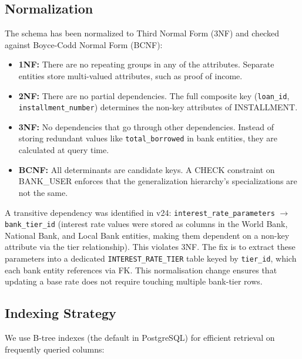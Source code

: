 \documentclass[12pt,a4paper]{report}
\begin{document}
\subsection{Normalization}

The schema has been normalized to Third Normal Form (3NF) and checked against Boyce-Codd Normal Form (BCNF):

\begin{itemize}[noitemsep]
\item \textbf{1NF:} There are no repeating groups in any of the attributes. Separate entities store multi-valued attributes, such as proof of income.
\item \textbf{2NF:} There are no partial dependencies. The full composite key (\texttt{loan\_id}, \texttt{installment\_number}) determines the non-key attributes of INSTALLMENT.
\item \textbf{3NF:} No dependencies that go through other dependencies. Instead of storing redundant values like \texttt{total\_borrowed} in bank entities, they are calculated at query time.
\item \textbf{BCNF:} All determinants are candidate keys. A CHECK constraint on BANK\_USER enforces that the generalization hierarchy's specializations are not the same.
\end{itemize}

\label{sec:normalization}
A transitive dependency was identified in v24: \texttt{interest\_rate\_parameters} $\to$ \texttt{bank\_tier\_id} (interest rate values were stored as columns in the World Bank, National Bank, and Local Bank entities, making them dependent on a non-key attribute via the tier relationship). This violates 3NF. The fix is to extract these parameters into a dedicated \texttt{INTEREST\_RATE\_TIER} table keyed by \texttt{tier\_id}, which each bank entity references via FK. This normalisation change ensures that updating a base rate does not require touching multiple bank-tier rows.

\subsection{Indexing Strategy}

We use B-tree indexes (the default in PostgreSQL) for efficient retrieval on frequently queried columns:
\end{document}
